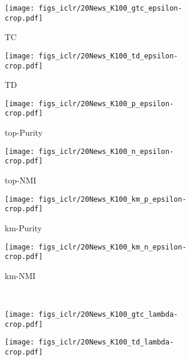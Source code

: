 \documentclass{article}
\begin{document}
\begin{figure}[t]
        \centering
         \begin{subfigure}[b]{0.16\linewidth}
                 \centering
                 \caption{TC}
                 \texttt{[image: figs\_iclr/20News\_K100\_gtc\_epsilon-crop.pdf]}
         \end{subfigure}
         \begin{subfigure}[b]{0.16\linewidth}
                 \centering
                 \caption{TD}
                 \texttt{[image: figs\_iclr/20News\_K100\_td\_epsilon-crop.pdf]}
         \end{subfigure} 
         \begin{subfigure}[b]{0.16\linewidth}
                 \centering
                 \caption{top-Purity}
                 \texttt{[image: figs\_iclr/20News\_K100\_p\_epsilon-crop.pdf]}
         \end{subfigure}\begin{subfigure}[b]{0.16\linewidth}
                 \centering
                \caption{top-NMI}
                 \texttt{[image: figs\_iclr/20News\_K100\_n\_epsilon-crop.pdf]}
         \end{subfigure}
                  \begin{subfigure}[b]{0.16\linewidth}
                 \centering
                \caption{km-Purity}
                 \texttt{[image: figs\_iclr/20News\_K100\_km\_p\_epsilon-crop.pdf]}
         \end{subfigure}
         \begin{subfigure}[b]{0.16\linewidth}
                 \centering
                \caption{km-NMI}
                 \texttt{[image: figs\_iclr/20News\_K100\_km\_n\_epsilon-crop.pdf]}
         \end{subfigure}
         \vspace{0.3cm}
        \\
         \begin{subfigure}[b]{0.16\linewidth}
                 \centering
                 \texttt{[image: figs\_iclr/20News\_K100\_gtc\_lambda-crop.pdf]}
         \end{subfigure}
         \begin{subfigure}[b]{0.16\linewidth}
                 \centering
                 \texttt{[image: figs\_iclr/20News\_K100\_td\_lambda-crop.pdf]}
         \end{subfigure} 

\end{figure}
\end{document}
